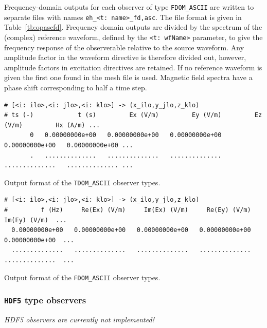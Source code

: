 \documentclass[onecolumn,a4paper]{article}
\numberwithin{equation}{section}
\begin{document}
Frequency-domain outputs for each observer of type \texttt{FDOM\_ASCII} are written to separate 
files with names \texttt{eh\_<t:~name>\_fd,asc}. The file format is given in Table~\ref{tb:opascfd}.
Frequency domain outputs are divided by the spectrum of the (complex) reference waveform, defined by 
the \texttt{<t:~wfName>} parameter, to give the frequency response of the observerable
relative to the source waveform. Any amplitude factor in the waveform directive is therefore divided out, however,
amplitude factors in excitation directives are retained. If no reference waveform is given the first one found 
in the mesh file is used. Magnetic field spectra have a phase shift corresponding to half a time step.

\begin{table}[th]
{\footnotesize
\begin{Verbatim}[frame=single]
# [<i: ilo>,<i: jlo>,<i: klo>] -> (x_ilo,y_jlo,z_klo)
# ts (-)            t (s)         Ex (V/m)         Ey (V/m)         Ez (V/m)         Hx (A/m) ...
       0   0.00000000e+00   0.00000000e+00   0.00000000e+00   0.00000000e+00   0.00000000e+00 ... 
       .   ..............   ..............   ..............   ..............   .............. ...
\end{Verbatim}
}
\caption{\label{tb:opasctd} Output format of the \texttt{TDOM\_ASCII} observer types.}
\end{table}

\begin{table}[th]
{\footnotesize
\begin{Verbatim}[frame=single]
# [<i: ilo>,<i: jlo>,<i: klo>] -> (x_ilo,y_jlo,z_klo)
#         f (Hz)     Re(Ex) (V/m)     Im(Ex) (V/m)     Re(Ey) (V/m)     Im(Ey) (V/m)  ...
  0.00000000e+00   0.00000000e+00   0.00000000e+00   0.00000000e+00   0.00000000e+00  ...
  ..............   ..............   ..............   ..............   ..............  ...
\end{Verbatim}
}
\caption{\label{tb:opascfd} Output format of the \texttt{FDOM\_ASCII} observer types.}
\end{table}

\subsubsection{\texttt{HDF5} type observers}

{\color{red}\it HDF5 observers are currently not implemented!\\ \\}
\end{document}
